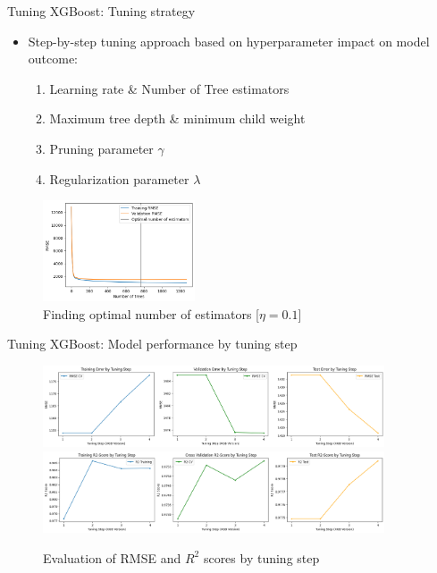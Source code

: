 \documentclass{beamer}
\begin{document}
    \begin{frame}{Tuning XGBoost: Tuning strategy} 

    \begin{itemize}
        \item Step-by-step tuning approach based on hyperparameter impact on model outcome:
            \begin{enumerate}
                \item Learning rate \& Number of Tree estimators
                \item Maximum tree depth \& minimum child weight
                \item Pruning parameter $\gamma$
                \item Regularization parameter $\lambda$
            \end{enumerate}
    \end{itemize}

    \begin{figure}[ht]
        \centering
        \includegraphics[width=0.4\textwidth]{xgb_num_estimators.png}
        \caption{Finding optimal number of estimators [$\eta = 0.1$]}
        \label{xgb_num_estimators}
    \end{figure}
\end{frame}


\begin{frame}{Tuning XGBoost: Model performance by tuning step}
\begin{figure}[ht]
    \centering
    \includegraphics[width=0.9\textwidth]{rmse_evaluation.png}
    \includegraphics[width=0.9\textwidth]{r2_evaluation.png}
    \caption{Evaluation of RMSE and $R^2$ scores by tuning step}
    \label{performance_evaluation}
\end{figure}
\end{frame}
\end{document}
